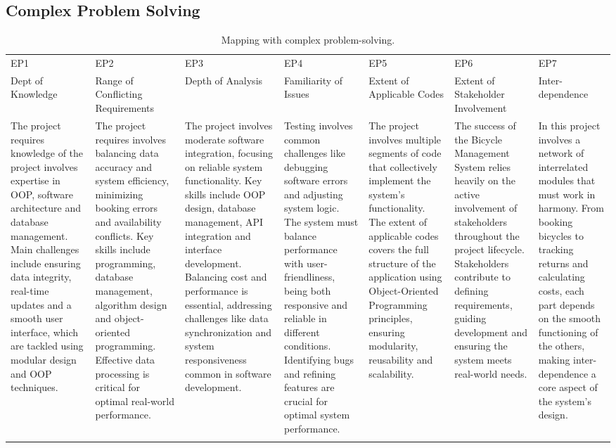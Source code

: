 \begin{center}
    \begin{table}[ht]
    \subsection{Complex Problem Solving} 
        \begin{tabular}{|p{}|p{}|p{}|p{}|p{}|p{}|p{}|}
        \hline
        EP1& EP2& EP3& EP4& EP5& EP6& EP7\\
        Dept of Knowledge & Range of Conflicting Requirements & Depth of Analysis & Familiarity of Issues & Extent of Applicable Codes & Extent of Stakeholder Involvement & Inter-dependence\\
        \hline 
         The project requires knowledge of the project involves expertise in OOP, software architecture and database management. Main challenges include ensuring data integrity, real-time updates and a smooth user interface, which are tackled using modular design and OOP techniques.
&The project requires involves balancing data accuracy and system efficiency, minimizing booking errors and availability conflicts. Key skills include programming, database management, algorithm design and object-oriented programming. Effective data processing is critical for optimal real-world performance.
 &The project involves moderate software integration, focusing on reliable system functionality. Key skills include OOP design, database management, API integration and interface development. Balancing cost and performance is essential, addressing challenges like data synchronization and system responsiveness common in software development.
&Testing involves common challenges like debugging software errors and adjusting system logic. The system must balance performance with user-friendliness, being both responsive and reliable in different conditions. Identifying bugs and refining features are crucial for optimal system performance.
&The project involves multiple segments of code that collectively implement the system’s functionality. The extent of applicable codes covers the full structure of the application using Object-Oriented Programming principles, ensuring modularity, reusability and scalability.
&The success of the Bicycle Management System relies heavily on the active involvement of stakeholders throughout the project lifecycle. Stakeholders contribute to defining requirements, guiding development and ensuring the system meets real-world needs.
&In this project involves a network of interrelated modules that must work in harmony. From booking bicycles to tracking returns and calculating costs, each part depends on the smooth functioning of the others, making inter-dependence a core aspect of the system’s design.
\\
        &&&&&&\\
        \hline 
        \end{tabular}
         \centering
        \caption{Mapping with complex problem-solving.}
        \label{tab:p_solve}
    \end{table}
     
\end{center}

